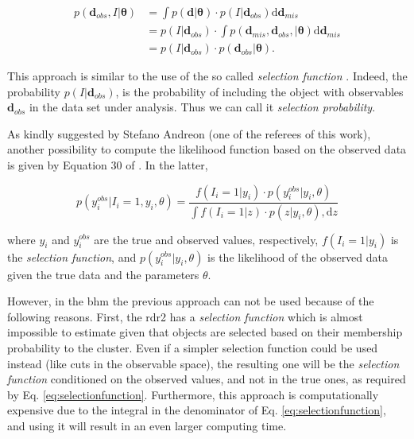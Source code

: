 \begin{align}
\label{eq:MAR}
p(\mathbf{d}_{obs},I|\boldsymbol{\theta})&=\int p(\mathbf{d}|\boldsymbol{\theta})\cdot p(I|\mathbf{d}_{obs})\mathrm{d}\mathbf{d}_{mis}\nonumber \\
&=p(I|\mathbf{d}_{obs})\cdot \int p(\mathbf{d}_{mis},\mathbf{d}_{obs},|\boldsymbol{\theta})\mathrm{d}\mathbf{d}_{mis}\nonumber\\
&=p(I|\mathbf{d}_{obs})\cdot p(\mathbf{d}_{obs}|\boldsymbol{\theta}).
\end{align}

This approach is similar to the use of the so called \emph{selection function} \cite[see for example][]{2013SADM....6...15A}. Indeed, the probability $p(I|\mathbf{d}_{obs})$, is the probability of including the object with observables $\mathbf{d}_{obs}$ in the data set under analysis. Thus we can call it  \emph{selection probability}.

As kindly suggested by Stefano Andreon (one of the referees of this work), another possibility to compute the likelihood function based on the observed data is given by Equation 30 of \citet{2013SADM....6...15A}. In the latter,

\begin{equation}
\label{eq:selectionfunction}
p(y_i^{obs}|I_i = 1,y_i,\theta)=\frac{f(I_i=1|y_i)\cdot p(y_i^{obs}|y_i,\theta)}{\int f(I_i=1|z)\cdot p(z|y_i,\theta),\mathrm{d}z}
\end{equation}

where $y_i$ and $y_i^{obs}$ are the true and observed values, respectively, $f(I_i=1|y_i)$ is the \emph{selection function}, and $p(y_i^{obs}|y_i,\theta)$ is the likelihood of the observed data given the true data and the parameters $\theta$. 

However, in the \gls{bhm} the previous approach can not be used because of the following reasons. First, the \gls{rdr2} has a \emph{selection function} which is almost impossible to estimate given that objects are selected based on their membership probability to the cluster. Even if a simpler selection function could be used instead (like cuts in the observable space), the resulting one will be the \emph{selection function} conditioned on the observed values, and not in the true ones, as required by Eq. \ref{eq:selectionfunction}. Furthermore, this approach is computationally expensive due to the integral in the denominator of Eq. \ref{eq:selectionfunction}, and using it will result in an even larger computing time.

